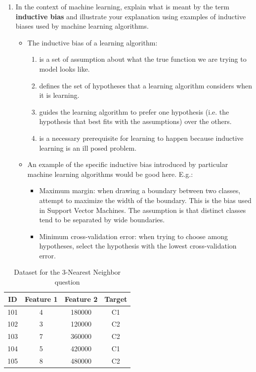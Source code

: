 \documentclass[solution]{ditpaper}
\begin{document}
\begin{enumerate}
\begin{answer}
\begin{center}
		\end{center}
	\end{answer}
	\item  In the context of machine learning, explain what is meant by the term \textbf{inductive bias} and illustrate your explanation using examples of inductive biases used by machine learning algorithms.
	\begin{answer}
		\begin{itemize}
				\item The inductive bias of a learning algorithm:
				\begin{enumerate}
					\item is a set of assumption about what the true function we are trying to model looks like.
					\item defines the set of hypotheses that a learning algorithm considers when it is learning.
					\item guides the learning algorithm to prefer one hypothesis (i.e. the hypothesis that best fits with the assumptions) over the others. 
					\item is a necessary prerequisite for learning to happen because inductive learning is an ill posed problem. 
				\end{enumerate}	
				\item An example of the specific inductive bias introduced by particular machine learning algorithms would be good here. E.g.:		
				\begin{itemize}
					\item Maximum margin: when drawing a boundary between two classes, attempt to maximize the width of the boundary. This is the bias used in Support Vector Machines. The assumption is that distinct classes tend to be separated by wide boundaries.
					\item Minimum cross-validation error: when trying to choose among hypotheses, select the hypothesis with the lowest cross-validation error.
				\end{itemize}
			\end{itemize}
	\end{answer}
\end{enumerate}


\newpage


\begin{table}[htdp]
\caption{Dataset for the 3-Nearest Neighbor question}
\begin{center}
\begin{tabular}{|c|c|c|c|}
\hline
ID & Feature 1 & Feature 2  & Target \\
\hline
101 & 4 &	180000 & C1\\
102 & 3 &	120000 & C2\\
103 & 7 &	360000 & C2\\
104 & 5 &	420000 &	C1\\
105 & 8 &	480000 &	C2\\
\hline
\end{tabular}
\end{center}
\label{tab:3nn-data}
\end{table}%
\end{document}

